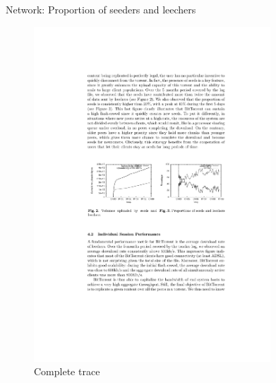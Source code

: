 \begin{frame}{Network: Proportion of seeders and leechers}
	
\begin{figure}	
	\includegraphics[width=0.79\textwidth]{figs/10/bt-fig6}
	\caption{Complete trace}
\end{figure}	
	
\end{frame}


